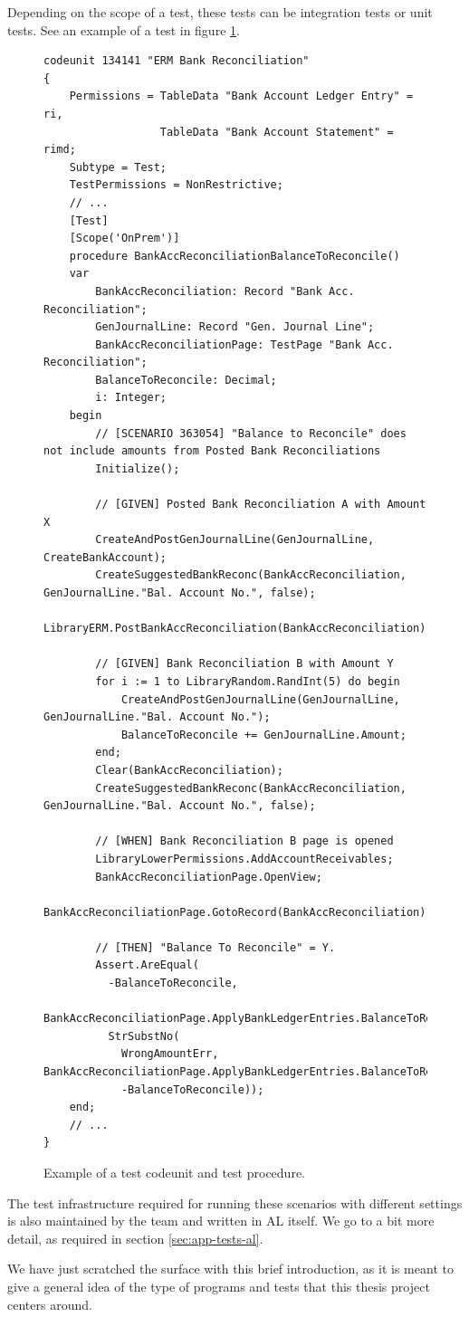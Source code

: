 Depending on the scope of a test, these tests can be integration tests or unit tests. See
an example of a test in figure \ref{f:app-al-test}.

\begin{figure}
    \begin{Verbatim}[fontsize=\tiny]
codeunit 134141 "ERM Bank Reconciliation"
{
    Permissions = TableData "Bank Account Ledger Entry" = ri,
                  TableData "Bank Account Statement" = rimd;
    Subtype = Test;
    TestPermissions = NonRestrictive;
    // ...
    [Test]
    [Scope('OnPrem')]
    procedure BankAccReconciliationBalanceToReconcile()
    var
        BankAccReconciliation: Record "Bank Acc. Reconciliation";
        GenJournalLine: Record "Gen. Journal Line";
        BankAccReconciliationPage: TestPage "Bank Acc. Reconciliation";
        BalanceToReconcile: Decimal;
        i: Integer;
    begin
        // [SCENARIO 363054] "Balance to Reconcile" does not include amounts from Posted Bank Reconciliations
        Initialize();

        // [GIVEN] Posted Bank Reconciliation A with Amount X
        CreateAndPostGenJournalLine(GenJournalLine, CreateBankAccount);
        CreateSuggestedBankReconc(BankAccReconciliation, GenJournalLine."Bal. Account No.", false);
        LibraryERM.PostBankAccReconciliation(BankAccReconciliation);

        // [GIVEN] Bank Reconciliation B with Amount Y
        for i := 1 to LibraryRandom.RandInt(5) do begin
            CreateAndPostGenJournalLine(GenJournalLine, GenJournalLine."Bal. Account No.");
            BalanceToReconcile += GenJournalLine.Amount;
        end;
        Clear(BankAccReconciliation);
        CreateSuggestedBankReconc(BankAccReconciliation, GenJournalLine."Bal. Account No.", false);

        // [WHEN] Bank Reconciliation B page is opened
        LibraryLowerPermissions.AddAccountReceivables;
        BankAccReconciliationPage.OpenView;
        BankAccReconciliationPage.GotoRecord(BankAccReconciliation);

        // [THEN] "Balance To Reconcile" = Y.
        Assert.AreEqual(
          -BalanceToReconcile,
          BankAccReconciliationPage.ApplyBankLedgerEntries.BalanceToReconcile.AsDEcimal,
          StrSubstNo(
            WrongAmountErr, BankAccReconciliationPage.ApplyBankLedgerEntries.BalanceToReconcile.Caption,
            -BalanceToReconcile));
    end;
    // ...
}
    \end{Verbatim}
    \caption{Example of a test codeunit and test procedure.}
    \label{f:app-al-test}
\end{figure}

The test infrastructure required for running these scenarios with different settings is also maintained
by the team and written in AL itself. We go to a bit more detail, as required in section \ref{sec:app-tests-al}.

We have just scratched the surface with this brief introduction, as it is meant to give a general idea of the
type of programs and tests that this thesis project centers around.